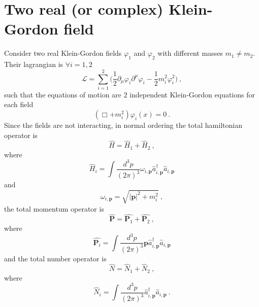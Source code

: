 \chapter{Two real (or complex) Klein-Gordon field}

    Consider two real Klein-Gordon fields $\varphi_1$ and $\varphi_2$ with different masses $m_1 \neq m_2$. Their lagrangian is $\forall i = 1,2$
    \begin{equation*}
        \mathcal L = \sum_{i=1}^{2} \Big ( \frac{1}{2} \partial_\mu \varphi_i \partial^\mu \varphi_i - \frac{1}{2} m_i^2 \varphi^2_i \Big) ~,
    \end{equation*}
    such that the equations of motion are $2$ independent Klein-Gordon equations for each field
    \begin{equation*}
        (\Box + m_i^2) \varphi_i (x) = 0 ~.
    \end{equation*}
    Since the fields are not interacting, in normal ordering the total hamiltonian operator is 
    \begin{equation*}
        \hat H = \hat H_1 + \hat H_2 ~,
    \end{equation*}
    where 
    \begin{equation*}
        \hat H_i = \int \frac{d^3 p}{(2\pi)^3} \omega_{i, \mathbf p} \hat a_{i, \mathbf p}^\dagger \hat a_{i, \mathbf p} 
    \end{equation*}
    and 
    \begin{equation*}
        \omega_{i, \mathbf p} = \sqrt{|\mathbf p|^2 + m_i^2} ~,
    \end{equation*}
    the total momentum operator is 
    \begin{equation*}
        \hat{\mathbf P} = \hat{\mathbf P_1} + \hat{\mathbf P_2}  ~,
    \end{equation*}
    where 
    \begin{equation*}
        \hat{\mathbf P_i} = \int \frac{d^3 p}{(2\pi)^3} \mathbf p \hat a_{i, \mathbf p}^\dagger \hat a_{i, \mathbf p} 
    \end{equation*}
    and the total number operator is 
    \begin{equation*}
        \hat N = \hat N_1 + \hat N_2 ~,
    \end{equation*}
    where 
    \begin{equation*}
        \hat N_i = \int \frac{d^3 p}{(2\pi)^3} \hat a_{i, \mathbf p}^\dagger \hat a_{i, \mathbf p} ~.
    \end{equation*}

